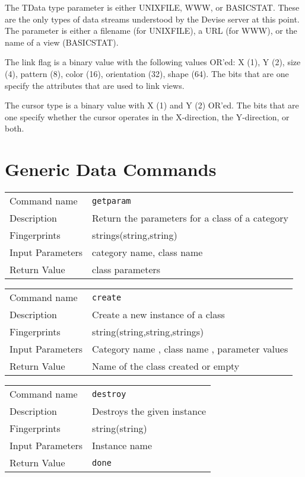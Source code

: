 The TData type parameter is either UNIXFILE, WWW, or BASICSTAT. These
are the only types of data streams understood by the Devise server at
this point.  The parameter is either a filename (for UNIXFILE), a URL
(for WWW), or the name of a view (BASICSTAT).

The link flag is a binary value with the following values OR'ed: X
(1), Y (2), size (4), pattern (8), color (16), orientation (32), shape
(64). The bits that are one specify the attributes that are used to
link views.

The cursor type is a binary value with X (1) and Y (2) OR'ed. The bits
that are one specify whether the cursor operates in the X-direction,
the Y-direction, or both.

\section{Generic Data Commands}
\noindent
\begin{tabular}{l|p{5in}}
\hline
Command name &{\tt getparam }\\ 
Description &
Return the parameters for a class of a category
 	\\
Fingerprints & strings(string,string)\\
Input Parameters&category name, class name\\
Return Value&class parameters\\
\hline
\end{tabular}
\bigskip

\noindent
\begin{tabular}{l|p{5in}}
\hline
Command name &{\tt create }\\ 
Description &
 Create a new instance of a class 
 	\\
Fingerprints & string(string,string,strings)\\
Input Parameters& Category name , class name , parameter values \\
Return Value& Name of the class created or empty \\
\hline
\end{tabular}
\bigskip

\noindent
\begin{tabular}{l|p{5in}}
\hline
Command name &{\tt destroy }\\ 
Description &
 Destroys the given instance 
 	\\
Fingerprints & string(string)\\
Input Parameters& Instance name \\
Return Value&{\tt done}\\
\hline
\end{tabular}
\bigskip

